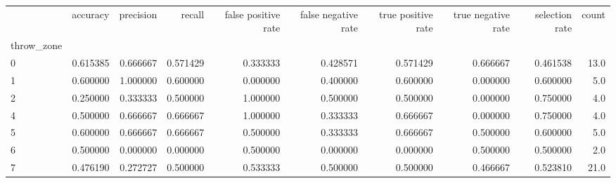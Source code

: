 \begin{tabular}{lrrrrrrrrr}
\toprule
{} &  accuracy &  precision &    recall &  false positive rate &  false negative rate &  true positive rate &  true negative rate &  selection rate &  count \\
throw\_zone &           &            &           &                      &                      &                     &                     &                 &        \\
\midrule
0          &  0.615385 &   0.666667 &  0.571429 &             0.333333 &             0.428571 &            0.571429 &            0.666667 &        0.461538 &   13.0 \\
1          &  0.600000 &   1.000000 &  0.600000 &             0.000000 &             0.400000 &            0.600000 &            0.000000 &        0.600000 &    5.0 \\
2          &  0.250000 &   0.333333 &  0.500000 &             1.000000 &             0.500000 &            0.500000 &            0.000000 &        0.750000 &    4.0 \\
4          &  0.500000 &   0.666667 &  0.666667 &             1.000000 &             0.333333 &            0.666667 &            0.000000 &        0.750000 &    4.0 \\
5          &  0.600000 &   0.666667 &  0.666667 &             0.500000 &             0.333333 &            0.666667 &            0.500000 &        0.600000 &    5.0 \\
6          &  0.500000 &   0.000000 &  0.000000 &             0.500000 &             0.000000 &            0.000000 &            0.500000 &        0.500000 &    2.0 \\
7          &  0.476190 &   0.272727 &  0.500000 &             0.533333 &             0.500000 &            0.500000 &            0.466667 &        0.523810 &   21.0 \\
\bottomrule
\end{tabular}
